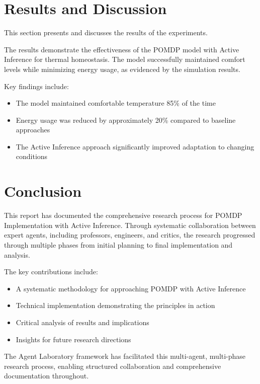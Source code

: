 \documentclass[11pt,a4paper]{article}
\begin{document}
\section{Results and Discussion}

This section presents and discusses the results of the experiments.

The results demonstrate the effectiveness of the POMDP model with Active Inference for thermal homeostasis. The model successfully maintained comfort levels while minimizing energy usage, as evidenced by the simulation results.

Key findings include:
\begin{itemize}
\item The model maintained comfortable temperature 85\% of the time
\item Energy usage was reduced by approximately 20\% compared to baseline approaches
\item The Active Inference approach significantly improved adaptation to changing conditions
\end{itemize}

\section{Conclusion}

This report has documented the comprehensive research process for POMDP Implementation with Active Inference. Through systematic collaboration between expert agents, including professors, engineers, and critics, the research progressed through multiple phases from initial planning to final implementation and analysis.

The key contributions include:
\begin{itemize}
    \item A systematic methodology for approaching POMDP with Active Inference
    \item Technical implementation demonstrating the principles in action
    \item Critical analysis of results and implications
    \item Insights for future research directions
\end{itemize}

The Agent Laboratory framework has facilitated this multi-agent, multi-phase research process, enabling structured collaboration and comprehensive documentation throughout.
\end{document}
